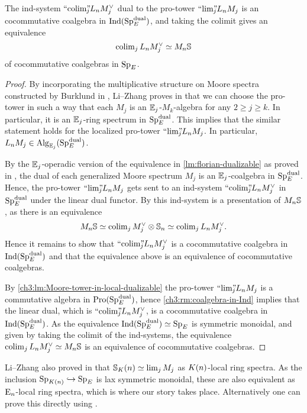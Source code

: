 \begin{lemma}
    \label{ch3:lm:coalgebra-ind-presentation-of-monochromatic-sphere}
    The ind-system $\indcolim L_n M_j^\vee$ dual to the pro-tower $\prolim L_n M_j$ is an cocommutative coalgebra in $\Ind(\SpE\dual)$, and taking the colimit gives an equivalence 
    \[\colim_j L_n M_j^\vee \simeq M_n\S\] 
    of cocommutative coalgebras in $\SpE$. 
\end{lemma}
\begin{proof}
    By incorporating the multiplicative structure on Moore spectra constructed by Burklund in \cite{burklund_2022}, Li--Zhang proves in \cite[2.1.4]{li-zhang_2023} that we can choose the pro-tower in such a way that each $M_j$ is an $\E_j$-$M_k$-algebra for any $2\geq j \geq k$. In particular, it is an $\E_j$-ring spectrum in $\SpE\dual$. This implies that the similar statement holds for the localized pro-tower $\prolim L_n M_j$. In particular, $L_n M_j \in \Alg_{\E_j}(\SpE\dual)$. 
    
    By the $\E_j$-operadic version of the equivalence in \cref{lm:florian-dualizable} as proved in \cite[2.21]{peroux_2022}, the dual of each generalized Moore spectrum $M_j$ is an $\E_j$-coalgebra in $\SpE\dual$. Hence, the pro-tower $\prolim L_n M_j$ gets sent to an ind-system $\indcolim L_n M_j^\vee$ in $\SpE\dual$ under the linear dual functor. By \cite[7.10(c)]{hovey-strickland_99} this ind-system is a presentation of $M_n\S$, as there is an equivalence 
    \[M_n \S \simeq \colim_j M_j^\vee \otimes \S_n \simeq \colim_j L_n M_j^\vee.\]
    Hence it remains to show that $\indcolim L_n M_j^\vee$ is a cocommutative coalgebra in $\Ind(\SpE\dual)$ and that the equivalence above is an equivalence of cocommutative coalgebras. 

    By \cref{ch3:lm:Moore-tower-in-local-dualizable} the pro-tower $\prolim L_n M_j$ is a commutative algebra in $\Pro(\SpE\dual)$, hence \cref{ch3:rm:coalgebra-in-Ind} implies that the linear dual, which is $\indcolim L_n M_j^\vee$, is a cocommutative coalgebra in $\Ind(\SpE\dual)$. As the equivalence $\Ind(\SpE\dual)\simeq \SpE$ is symmetric monoidal, and given by taking the colimit of the ind-systems, the equivalence $\colim_j L_n M_j^\vee \simeq M_n \S$ is an equivalence of cocommutative coalgebras.  
\end{proof}

\begin{remark}
    Li--Zhang also proved in \cite[2.1.5]{li-zhang_2023} that $\S_\Kn \simeq \lim_j M_j$ as $\Kn$-local ring spectra. As the inclusion $\SpKn\hookrightarrow \SpE$ is lax symmetric monoidal, these are also equivalent as $\En$-local ring spectra, which is where our story takes place. Alternatively one can prove this directly using \cite[2.1.6]{li-zhang_2023}. 
\end{remark}

